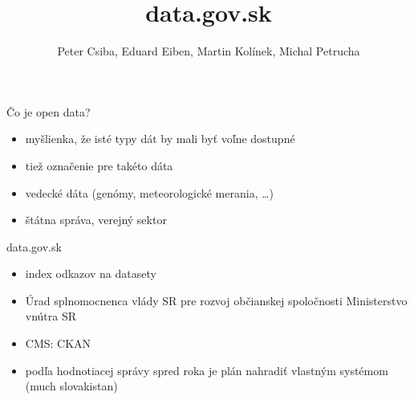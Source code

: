 \documentclass[slovak,14pt,utf8]{beamer}
\title{data.gov.sk}
\author[Csiba, Eiben, Kolínek, Petrucha]{Peter Csiba, Eduard Eiben, Martin
Kolínek, Michal Petrucha}
\institute{FMFI UK}
\date{\year}
\begin{document}
\begin{frame}{}
    \titlepage
\end{frame}

\begin{frame}{Čo je open data?}
    \begin{itemize}
        \item myšlienka, že isté typy dát by mali byť voľne dostupné
        \item tiež označenie pre takéto dáta
        \item vedecké dáta (genómy, meteorologické merania, \dots)
        \item štátna správa, verejný sektor
    \end{itemize}
\end{frame}

\begin{frame}{data.gov.sk}
    \begin{itemize}
        \item index odkazov na datasety
        \item Úrad splnomocnenca vlády SR pre rozvoj občianskej spoločnosti Ministerstvo vnútra SR
        \item CMS: CKAN
        \item podľa hodnotiacej správy spred roka je plán nahradiť vlastným systémom (much slovakistan)
    \end{itemize}
\end{frame}

\begin{frame}{}
\end{frame}
\end{document}
